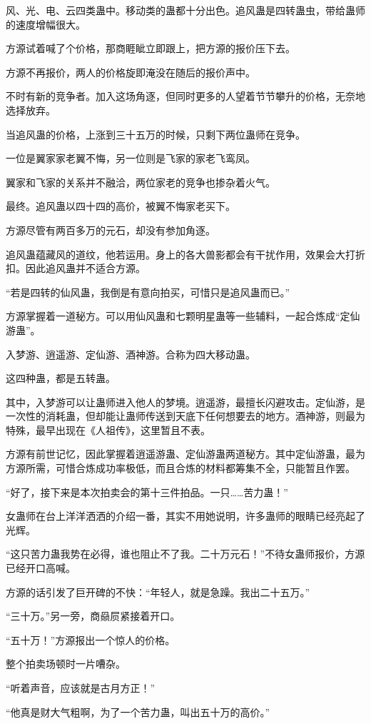 \begin{this_body}
风、光、电、云四类蛊中。移动类的蛊都十分出色。追风蛊是四转蛊虫，带给蛊师的速度增幅很大。

方源试着喊了个价格，那商睚眦立即跟上，把方源的报价压下去。

方源不再报价，两人的价格旋即淹没在随后的报价声中。

不时有新的竞争者。加入这场角逐，但同时更多的人望着节节攀升的价格，无奈地选择放弃。

当追风蛊的价格，上涨到三十五万的时候，只剩下两位蛊师在竞争。

一位是翼家家老翼不悔，另一位则是飞家的家老飞鸾凤。

翼家和飞家的关系并不融洽，两位家老的竞争也掺杂着火气。

最终。追风蛊以四十四的高价，被翼不悔家老买下。

方源尽管有两百多万的元石，却没有参加角逐。

追风蛊蕴藏风的道纹，他若运用。身上的各大兽影都会有干扰作用，效果会大打折扣。因此追风蛊并不适合方源。

“若是四转的仙风蛊，我倒是有意向拍买，可惜只是追风蛊而已。”

方源掌握着一道秘方。可以用仙风蛊和七颗明星蛊等一些辅料，一起合炼成“定仙游蛊”。

入梦游、逍遥游、定仙游、酒神游。合称为四大移动蛊。

这四种蛊，都是五转蛊。

其中，入梦游可以让蛊师进入他人的梦境。逍遥游，最擅长闪避攻击。定仙游，是一次性的消耗蛊，但却能让蛊师传送到天底下任何想要去的地方。酒神游，则最为特殊，最早出现在《人祖传》，这里暂且不表。

方源有前世记忆，因此掌握着逍遥游蛊、定仙游蛊两道秘方。其中定仙游蛊，最为方源所需，可惜合炼成功率极低，而且合炼的材料都筹集不全，只能暂且作罢。

“好了，接下来是本次拍卖会的第十三件拍品。一只……苦力蛊！”

女蛊师在台上洋洋洒洒的介绍一番，其实不用她说明，许多蛊师的眼睛已经亮起了光辉。

“这只苦力蛊我势在必得，谁也阻止不了我。二十万元石！”不待女蛊师报价，方源已经开口高喊。

方源的话引发了巨开碑的不快：“年轻人，就是急躁。我出二十五万。”

“三十万。”另一旁，商赑屃紧接着开口。

“五十万！”方源报出一个惊人的价格。

整个拍卖场顿时一片嘈杂。

“听着声音，应该就是古月方正！”

“他真是财大气粗啊，为了一个苦力蛊，叫出五十万的高价。”


\end{this_body}

